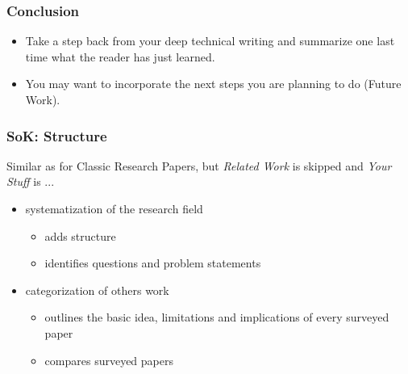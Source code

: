 \documentclass[xcolor={usenames,dvipsnames}]{beamer}
\begin{document}
\begin{frame}
	\frametitle{Conclusion}

	\begin{itemize}
		\item Take a step back from your deep technical writing and summarize one last time what the reader has just learned.
		\item You may want to incorporate the next steps you are planning to do (Future Work).
	\end{itemize}
\end{frame}

\begin{frame}
	\frametitle{SoK: Structure}

	Similar as for Classic Research Papers, but \emph{Related Work} is skipped and \emph{Your Stuff} is ...
	\begin{itemize}
		\item \alert{systematization} of the research field
			\begin{itemize}
				\item adds structure
				\item identifies questions and problem statements
			\end{itemize}
		\item \alert{categorization} of others work
			\begin{itemize}
				\item outlines the basic idea, limitations and implications of every surveyed paper
				\item compares surveyed papers
			\end{itemize}
	\end{itemize}
\end{frame}
\end{document}

